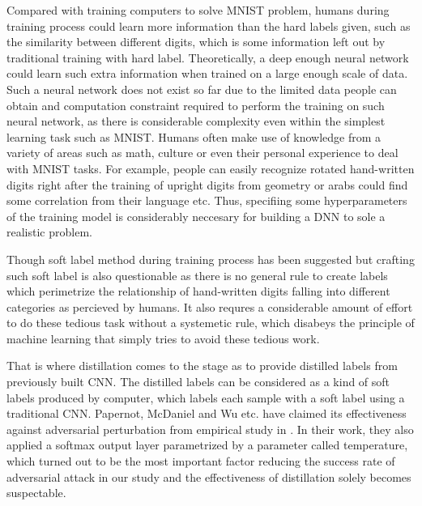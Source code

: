 \documentclass{article}
\begin{document}
Compared with training computers to solve MNIST problem, humans during training process could learn more information than the hard labels given, such as the similarity between different digits, 
which is some information left out by traditional training with hard label. 
Theoretically, a deep enough neural network could learn such extra information when trained on a large enough scale of data. Such a neural network does not exist so far due to the limited data people can obtain and computation constraint required to perform the training on such neural network, as there is considerable complexity even within the simplest learning task such as MNIST. Humans often make use of knowledge from a variety of areas such as math, culture or even their personal experience to deal with MNIST tasks. For example, people can easily recognize rotated hand-written digits right after the training of upright digits from geometry or arabs could find some correlation from their language etc.
Thus, specifiing some hyperparameters of the training model is considerably neccesary for building a DNN to sole a realistic problem.

Though soft label method during training process has been suggested but crafting such soft label is also questionable as there is no general rule to create labels which perimetrize the relationship of hand-written digits falling into different categories as percieved by humans.
It also requres a considerable amount of effort to do these tedious task without a systemetic rule, which disabeys the principle of machine learning that simply tries to avoid these tedious work.

That is where distillation comes to the stage as to provide distilled labels from previously built CNN. The distilled labels can be considered as a kind of soft labels produced by computer, which labels each sample with a soft label using a traditional CNN. 
Papernot, McDaniel and Wu etc. have claimed its effectiveness against adversarial perturbation from empirical study in \cite{Papernot}.
In their work, they also applied a softmax output layer parametrized by a parameter called temperature, which turned out to be the most important factor reducing the success rate of adversarial attack in our study and the effectiveness of distillation solely becomes suspectable.
\end{document}
